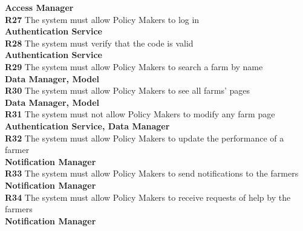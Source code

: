 \indent \textbf{Access Manager}\\
\textbf{R27} The system must allow Policy Makers to log in\\
\indent \textbf{Authentication Service}\\
\textbf{R28} The system must verify that the code is valid\\
\indent \textbf{Authentication Service}\\
\textbf{R29} The system must allow Policy Makers to search a farm by name\\
\indent \textbf{Data Manager, Model}\\
\textbf{R30} The system must allow Policy Makers to see all farms’ pages\\
\indent \textbf{Data Manager, Model}\\
\textbf{R31} The system must not allow Policy Makers to modify any farm page\\
\indent \textbf{Authentication Service, Data Manager}\\
\textbf{R32} The system must allow Policy Makers to update the performance of a farmer\\
\indent \textbf{Notification Manager}\\
\textbf{R33} The system must allow Policy Makers to send notifications to the farmers\\
\indent \textbf{Notification Manager}\\
\textbf{R34} The system must allow Policy Makers to receive requests of help by the farmers\\
\indent \textbf{Notification Manager}\\
